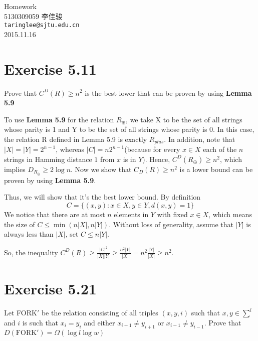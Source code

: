 \documentclass[11pt, fleqn, a4paper]{report}
\begin{document}
\begin{titlepage}
\vspace*{40mm}
\begin{center}
{\Huge Homework }\\[30mm]

{\Large 5130309059 \quad \quad 李佳骏}\\[3mm]
\texttt{taringlee@sjtu.edu.cn}\\[10mm]

2015.11.16

\end{center}
\end{titlepage}

\section*{Exercise 5.11}
Prove that $C^D(R) \geq n^2$ is the best lower that can be proven by using \textbf{Lemma 5.9}

To use \textbf{Lemma 5.9} for the relation $R_{\oplus}$, we take X to be the set of all strings whose parity is 1 and Y to be the set of all strings whose parity is 0. In this case, the relation R defined in Lemma 5.9 is exactly $R_{plus}$. In addition, note that $|X| = |Y| = 2^{n-1}$, whereas $|C| = n2^{n-1}$(because for every $x \in X$ each of the $n$ strings in Hamming distance $1$ from $x$ is in $Y$). Hence, $C^{D}(R_{\oplus}) \geq n^2$, which implies $D_{R_{\oplus}} \geq 2 \log{n}$. Now we show that $C_{D}(R) \geq n^2$ is a lower bound can be proven by using \textbf{Lemma 5.9}.

Thus, we will show that it's the best lower bound. By definition $$C = \{(x,y) : x \in X, y \in Y, d(x,y) = 1\}$$ We notice that there are at most $n$ elements in $Y$ with fixed $x \in X$, which means the size of $C \leq \min(n|X|, n|Y|)$. Without loss of generality, assume that $|Y|$ is always less than $|X|$, set $C \leq n|Y|$.

So, the inequality $C^D(R) \geq \frac{|C|^2}{|X||Y|} \geq \frac{n^2|Y|}{|X|} = n^2\frac{|Y|}{|X|} \geq n^2$.

\section*{Exercise 5.21}
Let FORK$'$ be the relation consisting of all triples $(x,y,i)$ such that $x,y \in \sum^{l}$ and $i$ is such that $x_i = y_i$ and either $x_{i+1} \neq y_{i+1}$ or $x_{i-1} \neq y_{i-1}$. Prove that $D(\mathrm{FORK}') = \Omega(\log{l}\log{w})$
\end{document}

